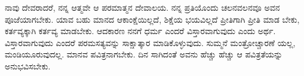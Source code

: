 ನಾವು ದೇವರಾದರೆ, ನನ್ನ ಆತ್ಮವೇ ಆ ಪರಮಾತ್ಮನ ದೇವಾಲಯ. ನನ್ನ ಪ್ರತಿಯೊಂದು ಚಲನವಲನವೂ ಅವನ ಪೂಜೆಯಾಗಬೇಕು. ಯಾವ ಬಹು ಮಾನದ ಆಕಾಂಕ್ಷೆಯಿಲ್ಲದೆ, ಶಿಕ್ಷೆಯ ಭಯವಿಲ್ಲದೆ ಪ್ರೀತಿಗಾಗಿ ಪ್ರೀತಿ ಮಾಡ ಬೇಕು, ಕರ್ತವ್ಯಕ್ಕಾಗಿ ಕರ್ತವ್ಯ ಮಾಡಬೇಕು. ಆದಕಾರಣ ನನಗೆ ಧರ್ಮ ಎಂದರೆ ವಿಸ್ತಾರವಾಗುವುದು ಎಂದು ಅರ್ಥ. ವಿಸ್ತಾರವಾಗುವುದು ಎಂದರೆ ಪರಮಸತ್ಯವನ್ನು ಸಾಕ್ಷಾತ್ಕಾರ ಮಾಡಿಕೊಳ್ಳುವುದು. ಸುಮ್ಮನೆ ಮಂತ್ರೋಚ್ಚಾರಣೆ ಯಲ್ಲ, ಮಂಡಿಯೂರುವುದಲ್ಲ. ಮಾನವ ಪವಿತ್ರನಾಗಬೇಕು. ದಿನ ಸಾಗಿದಂತೆ ಅವನು ಹೆಚ್ಚು ಹೆಚ್ಚು ಆ ಪವಿತ್ರತೆಯನ್ನು ಅನುಭವಿಸಬೇಕು.


